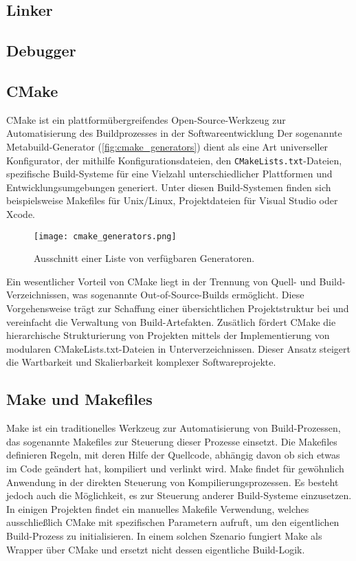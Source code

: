 \subsection*{Linker}

\subsection*{Debugger}

\subsection*{CMake}
CMake ist ein plattformübergreifendes Open-Source-Werkzeug zur Automatisierung des Buildprozesses in der Softwareentwicklung
Der sogenannte Metabuild-Generator (\autoref{fig:cmake_generators}) dient als eine Art universeller Konfigurator, der mithilfe Konfigurationsdateien, den \texttt{CMakeLists.txt}-Dateien, spezifische Build-Systeme für eine Vielzahl unterschiedlicher Plattformen und Entwicklungsumgebungen generiert.
Unter diesen Build-Systemen finden sich beispielsweise Makefiles für Unix/Linux, Projektdateien für Visual Studio oder Xcode.

\begin{figure}[H]
	\texttt{[image: cmake\_generators.png]}
	\caption{Ausschnitt einer Liste von verfügbaren Generatoren.}
	\label{fig:cmake_generators}
\end{figure}

Ein wesentlicher Vorteil von CMake liegt in der Trennung von Quell- und Build-Verzeichnissen, was sogenannte Out-of-Source-Builds ermöglicht.
Diese Vorgehensweise trägt zur Schaffung einer übersichtlichen Projektstruktur bei und vereinfacht die Verwaltung von Build-Artefakten.
Zusätlich fördert CMake die hierarchische Strukturierung von Projekten mittels der Implementierung von modularen CMakeLists.txt-Dateien in Unterverzeichnissen.
Dieser Ansatz steigert die Wartbarkeit und Skalierbarkeit komplexer Softwareprojekte.

\subsection*{Make und Makefiles}
Make ist ein traditionelles Werkzeug zur Automatisierung von Build-Prozessen, das sogenannte Makefiles zur Steuerung dieser Prozesse einsetzt.
Die Makefiles definieren Regeln, mit deren Hilfe der Quellcode, abhängig davon ob sich etwas im Code geändert hat, kompiliert und verlinkt wird.
Make findet für gewöhnlich Anwendung in der direkten Steuerung von Kompilierungsprozessen.
 Es besteht jedoch auch die Möglichkeit, es zur Steuerung anderer Build-Systeme einzusetzen.
In einigen Projekten findet ein manuelles Makefile Verwendung, welches ausschließlich CMake mit spezifischen Parametern aufruft, um den eigentlichen Build-Prozess zu initialisieren.
In einem solchen Szenario fungiert Make als Wrapper über CMake und ersetzt nicht dessen eigentliche Build-Logik.




